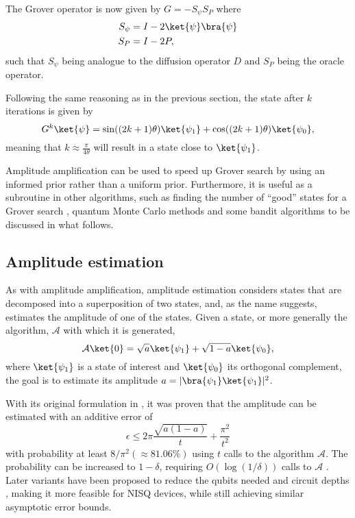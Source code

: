 The Grover operator is now given by $G=-S_\psi S_P$ where
\begin{align}
    S_\psi & = I - 2\ket{\psi}\bra{\psi} \\
    S_P    & = I - 2P,
\end{align}
such that $S_\psi$ being analogue to the diffusion operator $D$ and $S_P$ being the oracle operator.

Following the same reasoning as in the previous section, the state after $k$ iterations is given by
\begin{equation}
    G^k \ket{\psi} = \sin((2k+1)\theta)\ket{\psi_1} + \cos((2k+1)\theta)\ket{\psi_0},
\end{equation}
meaning that $k \approx \frac{\pi}{4\theta}$ will result in a state close to $\ket{\psi_1}$.

Amplitude amplification can be used to speed up Grover search by using an informed prior rather than a uniform prior.
Furthermore, it is useful as a subroutine in other algorithms, such as finding the number of \enquote{good} states for a Grover search \cite{brassard2002}, quantum Monte Carlo methods \cite{montanaro2015} and some bandit algorithms to be discussed in what follows.

\subsection{Amplitude estimation}
\label{sec:amplitude-estimation}
As with amplitude amplification, amplitude estimation considers states that are decomposed into a superposition of two states, and, as the name suggests, estimates the amplitude of one of the states.
Given a state, or more generally the algorithm, $\mathcal{A}$ with which it is generated,
\begin{equation}
    \mathcal{A} \ket{0} = \sqrt{a} \ket{\psi_1} + \sqrt{1-a} \ket{\psi_0},
\end{equation}
where $\ket{\psi_1}$ is a state of interest and $\ket{\psi_0}$ its orthogonal complement, the goal is to estimate its amplitude $a = \lvert\bra{\psi_1}\ket{\psi_1}\rvert^2$.

With its original formulation in \cite{brassard2002}, it was proven that the amplitude can be estimated with an additive error of
\begin{equation}
    \epsilon \leq 2\pi \frac{\sqrt{a(1-a)}}{t} +\frac{\pi^2}{t^2}
\end{equation}
with probability at least $8/\pi^2(\approx 81.06\%)$ using $t$ calls to the algorithm $\mathcal{A}$.
The probability can be increased to $1-\delta$, requiring $O(\log(1/\delta))$ calls to $\mathcal{A}$ \cite{montanaro2015}.
Later variants have been proposed to reduce the qubits needed and circuit depths \cite{suzuki2020, nakaji2020, grinko2021}, making it more feasible for NISQ devices, while still achieving similar asymptotic error bounds.


